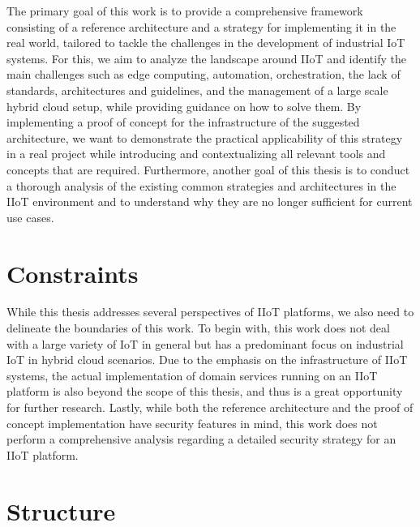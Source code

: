 The primary goal of this work is to provide a comprehensive framework consisting of a reference architecture and a strategy for implementing it in the real world, tailored to tackle the challenges in the development of industrial IoT systems. For this, we aim to analyze the landscape around IIoT and identify the main challenges such as edge computing, automation, orchestration, the lack of standards, architectures and guidelines, and the management of a large scale hybrid cloud setup, while providing guidance on how to solve them. By implementing a proof of concept for the infrastructure of the suggested architecture, we want to demonstrate the practical applicability of this strategy in a real project while introducing and contextualizing all relevant tools and concepts that are required. Furthermore, another goal of this thesis is to conduct a thorough analysis of the existing common strategies and architectures in the IIoT environment and to understand why they are no longer sufficient for current use cases. 


\section{Constraints}

While this thesis addresses several perspectives of IIoT platforms, we also need to delineate the boundaries of this work. To begin with, this work does not deal with a large variety of IoT in general but has a predominant focus on industrial IoT in hybrid cloud scenarios. Due to the emphasis on the infrastructure of IIoT systems, the actual implementation of domain services running on an IIoT platform is also beyond the scope of this thesis, and thus is a great opportunity for further research. Lastly, while both the reference architecture and the proof of concept implementation have security features in mind, this work does not perform a comprehensive analysis regarding a detailed security strategy for an IIoT platform.


\section{Structure}

